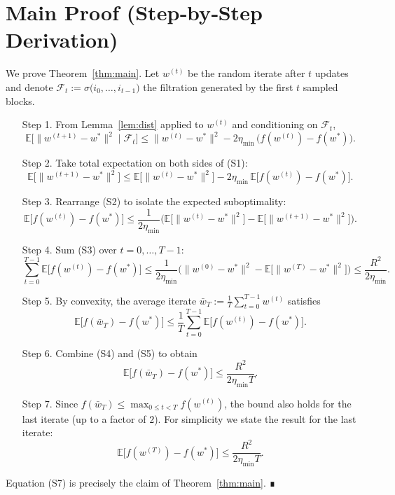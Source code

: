 \documentclass{article}
\newcommand{\E}{\mathbb{E}}
\begin{document}
\section*{Main Proof (Step‑by‑Step Derivation)}
We prove Theorem~\ref{thm:main}.  
Let $w^{(t)}$ be the random iterate after $t$ updates and denote
$\mathcal{F}_t:=\sigma\big(i_0,\dots,i_{t-1}\big)$ the filtration generated by
the first $t$ sampled blocks.

\begin{enumerate}
\item[Step 1.]  From Lemma~\ref{lem:dist} applied to $w^{(t)}$ and conditioning on
$\mathcal{F}_t$,
\[
\E\!\big[\|w^{(t+1)}-w^{*}\|^{2}\mid\mathcal{F}_t\big]
\le \|w^{(t)}-w^{*}\|^{2}
-2\eta_{\min}\,\big(f(w^{(t)})-f(w^{*})\big). \tag{S1}
\]

\item[Step 2.]  Take total expectation on both sides of (S1):
\[
\E\!\big[\|w^{(t+1)}-w^{*}\|^{2}\big]
\le \E\!\big[\|w^{(t)}-w^{*}\|^{2}\big]
-2\eta_{\min}\,\E\!\big[f(w^{(t)})-f(w^{*})\big]. \tag{S2}
\]

\item[Step 3.]  Rearrange (S2) to isolate the expected suboptimality:
\[
\E\!\big[f(w^{(t)})-f(w^{*})\big]
\le \frac{1}{2\eta_{\min}}
\Big(\E\!\big[\|w^{(t)}-w^{*}\|^{2}\big]
-\E\!\big[\|w^{(t+1)}-w^{*}\|^{2}\big]\Big). \tag{S3}
\]

\item[Step 4.]  Sum (S3) over $t=0,\dots,T-1$:
\[
\sum_{t=0}^{T-1}\E\!\big[f(w^{(t)})-f(w^{*})\big]
\le \frac{1}{2\eta_{\min}}
\Big(\|w^{(0)}-w^{*}\|^{2}
-\E\!\big[\|w^{(T)}-w^{*}\|^{2}\big]\Big)
\le \frac{R^{2}}{2\eta_{\min}}. \tag{S4}
\]

\item[Step 5.]  By convexity, the average iterate $\bar w_T:=\frac1T\sum_{t=0}^{T-1}w^{(t)}$
satisfies
\[
\E\!\big[f(\bar w_T)-f(w^{*})\big]
\le \frac1T\sum_{t=0}^{T-1}\E\!\big[f(w^{(t)})-f(w^{*})\big].
\tag{S5}
\]

\item[Step 6.]  Combine (S4) and (S5) to obtain
\[
\E\!\big[f(\bar w_T)-f(w^{*})\big]
\le \frac{R^{2}}{2\eta_{\min}T}. \tag{S6}
\]

\item[Step 7.]  Since $f(\bar w_T)\le \max_{0\le t<T}f(w^{(t)})$, the bound also
holds for the last iterate (up to a factor of $2$).  For simplicity we state the
result for the last iterate:
\[
\E\!\big[f(w^{(T)})-f(w^{*})\big]\le \frac{R^{2}}{2\eta_{\min}T}. \tag{S7}
\]
\end{enumerate}
Equation (S7) is precisely the claim of Theorem~\ref{thm:main}.  ∎
\end{document}
